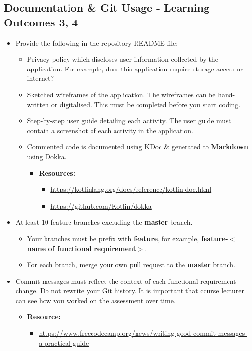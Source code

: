 \documentclass{article}
\begin{document}
\subsection*{Documentation \& Git Usage - Learning Outcomes 3, 4}
\begin{itemize}
    \item Provide the following in the repository README file:
    \begin{itemize}
        \item Privacy policy which discloses user information collected by the application. For example, does this application require storage access or internet? 
        \item Sketched wireframes of the application. The wireframes can be hand-written or digitalised. This must be completed before you start coding.
        \item Step-by-step user guide detailing each activity. The user guide must contain a screenshot of each activity in the application.
        \item Commented code is documented using KDoc \& generated to \textbf{Markdown} using Dokka.
        \begin{itemize}
            \item \textbf{Resources:}
            \begin{itemize}
                \item \footnotesize\href{https://kotlinlang.org/docs/reference/kotlin-doc.html}{https://kotlinlang.org/docs/reference/kotlin-doc.html}
                \item \footnotesize\href{https://github.com/Kotlin/dokka}{https://github.com/Kotlin/dokka}
            \end{itemize}
        \end{itemize} 
    \end{itemize}
    \item At least 10 feature branches excluding the \textbf{master} branch.
    \begin{itemize}
        \item Your branches must be prefix with \textbf{feature}, for example, \textbf{feature-$<$name of functional requirement$>$}.
        \item For each branch, merge your own pull request to the \textbf{master} branch.
    \end{itemize}
    \item Commit messages must reflect the context of each functional requirement change. Do not rewrite your Git history. It is important that course lecturer can see how you worked on the assessment over time.
    \begin{itemize}
        \item \textbf{Resource:} 
        \begin{itemize}
            \item \footnotesize\href{https://www.freecodecamp.org/news/writing-good-commit-messages-a-practical-guide}{https://www.freecodecamp.org/news/writing-good-commit-messages-a-practical-guide}
        \end{itemize}
	\end{itemize}
\end{itemize}
\end{document}
